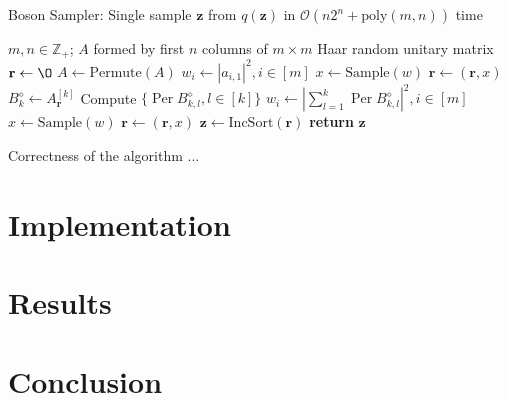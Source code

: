\documentclass[11pt]{article}
\theoremstyle{theorem}
\theoremstyle{theorem}
\theoremstyle{remark}
\theoremstyle{note}
\theoremstyle{plain}
\theoremstyle{definition}
\DeclareMathOperator*{\Per}{\mathrm{Per}}
\begin{document}
\begin{algorithm}
\caption{Boson Sampler: Single sample $\mathbf{z}$ from $q(\mathbf{z})$ in $\mathcal{O}(n2^n + \text{poly}(m, n))$ time}
\begin{algorithmic}[1]
\Require $m, n \in \mathbb{Z}_+$; $A$ formed by first $n$ columns of $m \times m$ Haar random unitary matrix
\State $\mathbf{r} \leftarrow \O $	
\State $A \leftarrow \text{Permute}(A)$	
\State $w_i \leftarrow \left|a_{i, 1}\right|^2, i \in [m]$	
\State $x \leftarrow \text{Sample}(w)$	
\State $\mathbf{r} \leftarrow (\mathbf{r}, x)$	
\State $B_k^\diamond \leftarrow A_{\mathbf{r}}^{[k]}$
\State Compute  $\{ \Per B_{k, l}^{\diamond}, l \in [k] \}$	
\State $w_i \leftarrow \left| \sum_{l = 1}^k \Per B_{k, l}^{\diamond} \right| ^2, i \in [m] $	
\State $x \leftarrow \text{Sample}(w)$
\State $\mathbf{r} \leftarrow (\mathbf{r}, x)$
\EndFor
\State $\mathbf{z} \leftarrow \text{IncSort}(\mathbf{r})$	
\State \textbf{return} $\mathbf{z}$
\end{algorithmic}
\end{algorithm}

Correctness of the algorithm ...

\section{Implementation} %

\section{Results}

\section{Conclusion}



\end{document}
